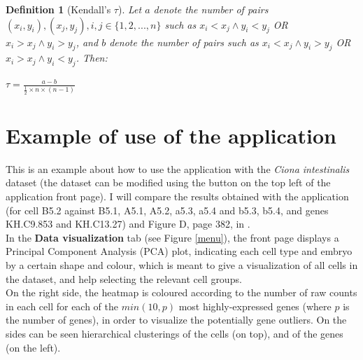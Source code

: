 \documentclass{report}
\newtheorem{definition}{Definition}[section]
\begin{document}
{\begin{definition}[Kendall's $\tau$]
{Let $a$ denote the number of pairs $(x_i, y_i), (x_j, y_j), i,j \in \{1,2, ..., n\}$ such as $x_i <  x_j \land y_i < y_j$ OR $x_i >  x_j \land y_i > y_j$, and $b$ denote the number of pairs such as $x_i <  x_j \land y_i > y_j$ OR $x_i >  x_j \land y_i < y_j$. Then:

\begin{center} $\tau = \frac{a-b}{\frac{1}{2} \times n \times (n - 1)}$ \end{center}}\end{definition}

\chapter{Example of use of the application}

This is an example about how to use the application with the \textit{Ciona intestinalis} dataset\cite{suyama2016singlecell} (the dataset can be modified using the button on the top left of the application front page). I will compare the results obtained with the application (for cell B5.2 against B5.1, A5.1, A5.2, a5.3, a5.4 and b5.3, b5.4, and genes KH.C9.853 and KH.C13.27) and Figure D, page 382, in \cite{matsuoka2013transcriptome}.\\

In the \textbf{Data visualization} tab (see Figure \ref{menu}), the front page displays a Principal Component Analysis (PCA) plot, indicating each cell type and embryo by a certain shape and colour, which is meant to give a visualization of all cells in the dataset, and help selecting the relevant cell groups.\\

On the right side, the heatmap is coloured according to the number of raw counts in each cell for each of the $min(10, p)$ most highly-expressed genes (where $p$ is the number of genes), in order to visualize the potentially gene outliers\cite{poirion2016single}. On the sides can be seen hierarchical clusterings of the cells (on top), and of the genes (on the left).

}
\end{document}
